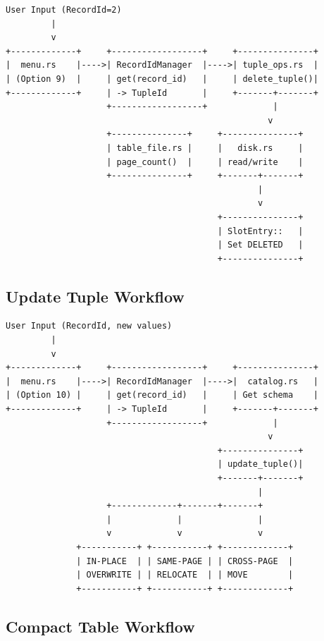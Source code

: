 \documentclass[11pt,a4paper]{article}
\begin{document}
\begin{lstlisting}
User Input (RecordId=2)
         |
         v
+-------------+     +------------------+     +---------------+
|  menu.rs    |---->| RecordIdManager  |---->| tuple_ops.rs  |
| (Option 9)  |     | get(record_id)   |     | delete_tuple()|
+-------------+     | -> TupleId       |     +-------+-------+
                    +------------------+             |
                                                    v
                    +---------------+     +---------------+
                    | table_file.rs |     |   disk.rs     |
                    | page_count()  |     | read/write    |
                    +---------------+     +-------+-------+
                                                  |
                                                  v
                                          +---------------+
                                          | SlotEntry::   |
                                          | Set DELETED   |
                                          +---------------+
\end{lstlisting}

\subsection{Update Tuple Workflow}

\begin{lstlisting}
User Input (RecordId, new values)
         |
         v
+-------------+     +------------------+     +---------------+
|  menu.rs    |---->| RecordIdManager  |---->|  catalog.rs   |
| (Option 10) |     | get(record_id)   |     | Get schema    |
+-------------+     | -> TupleId       |     +-------+-------+
                    +------------------+             |
                                                    v
                                          +---------------+
                                          | update_tuple()|
                                          +-------+-------+
                                                  |
                    +-------------+-------+-------+
                    |             |               |
                    v             v               v
              +-----------+ +-----------+ +-------------+
              | IN-PLACE  | | SAME-PAGE | | CROSS-PAGE  |
              | OVERWRITE | | RELOCATE  | | MOVE        |
              +-----------+ +-----------+ +-------------+
\end{lstlisting}

\subsection{Compact Table Workflow}
\end{document}
